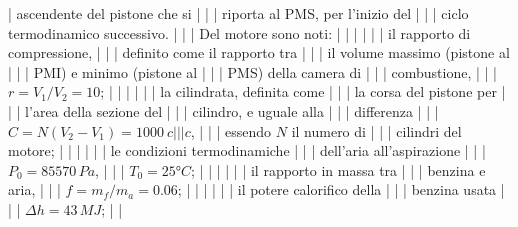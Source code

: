 \documentclass[letterpaper,10pt,italian]{jupyterBook}
\begin{document}
| ascendente del pistone che si     |                                   |
| riporta al PMS, per l’inizio del  |                                   |
| ciclo termodinamico successivo.   |                                   |
| Del motore sono noti:             |                                   |
|                                   |                                   |
| \sphinxhyphen{}   il rapporto di compressione,  |                                   |
|     definito come il rapporto tra |                                   |
|     il volume massimo (pistone al |                                   |
|     PMI) e minimo (pistone al     |                                   |
|     PMS) della camera di          |                                   |
|     combustione,                  |                                   |
|     \(r = V_1 / V_2 = 10\);         |                                   |
|                                   |                                   |
| \sphinxhyphen{}   la cilindrata, definita come  |                                   |
|     la corsa del pistone per      |                                   |
|     l’area della sezione del      |                                   |
|     cilindro, e uguale alla       |                                   |
|     differenza                    |                                   |
|     \(C = N (V_2 - V_1) = 1000 \ c |                                   |
| c\),                               |                                   |
|     essendo \(N\) il numero di      |                                   |
|     cilindri del motore;          |                                   |
|                                   |                                   |
| \sphinxhyphen{}   le condizioni termodinamiche  |                                   |
|     dell’aria all’aspirazione     |                                   |
|     \(P_0 = 85570 \, Pa\),          |                                   |
|     \(T_0 = 25°C\);                 |                                   |
|                                   |                                   |
| \sphinxhyphen{}   il rapporto in massa tra      |                                   |
|     benzina e aria,               |                                   |
|     \(f = m_f / m_a = 0.06\);       |                                   |
|                                   |                                   |
| \sphinxhyphen{}   il potere calorifico della    |                                   |
|     benzina usata                 |                                   |
|     \(\Delta h = 43 \, MJ\);        |                                   |
\end{document}
